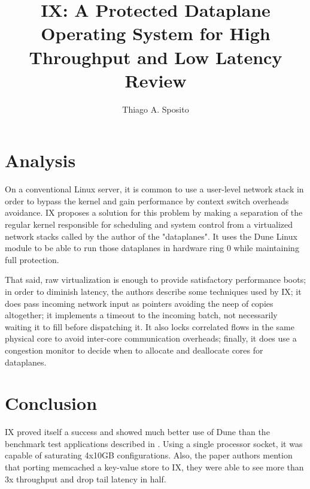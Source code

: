 \documentclass[12pt]{article}
\title{ IX: A Protected Dataplane Operating System for High Throughput and Low Latency Review}
\author{Thiago A. Sposito\inst{1} }
\begin{document}
 

\maketitle

\section{Analysis}
On a conventional Linux server, it is common to use a user-level network stack in order to bypass the kernel and gain performance by context switch overheads avoidance. IX \cite{belay2014ix}proposes a solution for this problem by making a separation of the regular kernel responsible for scheduling and system control from a  virtualized network stacks called by the author of the "dataplanes". It uses the Dune \cite{belay2012dune} Linux module to be able to run those dataplanes in hardware ring 0 while maintaining full protection.

That said, raw virtualization is enough to provide satisfactory performance boots; in order to diminish latency, the authors describe some techniques used by IX; it does pass incoming network input as pointers avoiding the neep of copies altogether; it implements a timeout to the incoming batch, not necessarily waiting it to fill before dispatching it. It also locks correlated flows in the same physical core to avoid inter-core communication overheads; finally, it does use a congestion monitor to decide when to allocate and deallocate cores for dataplanes.

\section{Conclusion}
IX proved itself a success and showed much better use of Dune than the benchmark test applications described in \cite{belay2012dune}. Using a single processor socket, it was capable of saturating 4x10GB configurations. Also, the paper authors mention that porting memcached a key-value store\cite{jose2011memcached} to IX, they were able to see more than 3x throughput and drop tail latency in half.


\end{document}
